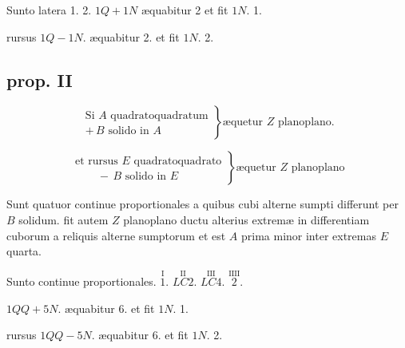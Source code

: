 \documentclass[11pt,a4paper]{article}
\begin{document}
Sunto latera 1. 2. $1Q + 1N$ æquabitur 2 et fit $1N$. 1.

rursus $1Q - 1N$. æquabitur 2. et fit $1N$. 2.

\subsection*{prop. II}

\[ \left. \begin{array}{l} \text{Si } A \text{ quadratoquadratum} \\ +\,B \text{ solido in } A \end{array} \right\} \text{æquetur } Z \text{ planoplano.} \]

\[ \left. \begin{array}{l} \text{et rursus } E \text{ quadratoquadrato} \\ \qquad -\,B \text{ solido in } E \end{array} \right\} \text{æquetur } Z \text{ planoplano} \]


Sunt quatuor continue proportionales a quibus cubi alterne sumpti differunt per $B$ solidum. fit autem $Z$ planoplano ductu alterius extremæ in differentiam cuborum a reliquis alterne sumptorum et est $A$ prima minor inter extremas $E$ quarta.

Sunto continue proportionales. $\overset{\text{I}}{1}$. $\overset{\text{II}}{LC2}$. $\overset{\text{III}}{LC4}$. $\overset{\text{IIII}}{2}$.

$1QQ + 5N$. æquabitur 6. et fit $1N$. 1.

rursus $1QQ - 5N$. æquabitur 6. et fit $1N$. 2.
\end{document}
